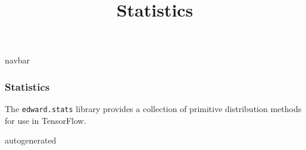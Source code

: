 \title{Statistics}

{{navbar}}

\subsubsection{Statistics}

The \texttt{edward.stats} library provides a collection of primitive
distribution methods for use in TensorFlow.

{{autogenerated}}
